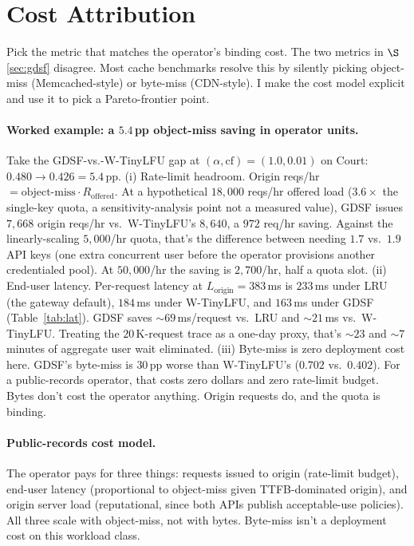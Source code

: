 \documentclass[letterpaper,twocolumn,10pt]{article}
\begin{document}
\section{Cost Attribution}\label{sec:weighted}
\noindent Pick the metric that matches the operator's binding
cost. The two metrics in $\S$\ref{sec:gdsf} disagree. Most cache
benchmarks resolve this by silently picking object-miss
(Memcached-style) or byte-miss (CDN-style). I make the cost model
explicit and use it to pick a Pareto-frontier point.
\paragraph{Worked example: a $5.4$\,pp object-miss saving in
operator units.} Take the GDSF-vs.-W-TinyLFU gap at $(\alpha,
\text{cf}) = (1.0, 0.01)$ on Court: $0.480 \to 0.426 = 5.4$\,pp.
(i) Rate-limit headroom. Origin reqs/hr $=
\text{object-miss} \cdot R_{\text{offered}}$. At a hypothetical
$18{,}000$ reqs/hr offered load ($3.6\times$ the single-key quota,
a sensitivity-analysis point not a measured value), GDSF issues
$7{,}668$ origin reqs/hr vs.\ W-TinyLFU's $8{,}640$, a $972$
req/hr saving. Against the linearly-scaling $5{,}000$/hr quota,
that's the difference between needing $1.7$ vs.\ $1.9$ API keys
(one extra concurrent user before the operator provisions another
credentialed pool). At $50{,}000$/hr the saving is $2{,}700$/hr,
half a quota slot.
(ii) End-user latency. Per-request latency at
$L_{\text{origin}} = 383$\,ms is $233$\,ms under LRU (the gateway
default), $184$\,ms under W-TinyLFU, and $163$\,ms under GDSF
(Table~\ref{tab:lat}). GDSF saves $\sim 69$\,ms/request vs.\ LRU
and $\sim 21$\,ms vs.\ W-TinyLFU. Treating the $20$\,K-request
trace as a one-day proxy, that's $\sim 23$ and $\sim 7$ minutes
of aggregate user wait eliminated.
(iii) Byte-miss is zero deployment cost here. GDSF's
byte-miss is $30$\,pp worse than W-TinyLFU's ($0.702$ vs.\
$0.402$). For a public-records operator, that costs zero dollars
and zero rate-limit budget. Bytes don't cost the operator anything.
Origin requests do, and the quota is binding.
\paragraph{Public-records cost model.} The operator pays for three
things: requests issued to origin (rate-limit budget), end-user
latency (proportional to object-miss given TTFB-dominated origin),
and origin server load (reputational, since both APIs publish
acceptable-use policies). All three scale with object-miss, not
with bytes. Byte-miss isn't a deployment cost on
this workload class.
\end{document}
